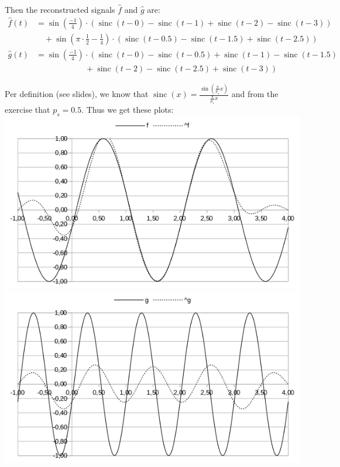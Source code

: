 \documentclass[a4paper,parskip,headheight=38pt]{scrartcl} %
\DeclareMathOperator{\sinc}{sinc}
\begin{document}
Then the reconstructed signals $\hat{f}$ and $\hat{g}$ are:
\begin{align*}
    \hat{f}(t) &= \sin(\frac{-1}{4}) \cdot \left(\sinc(t -0) - \sinc(t - 1) + \sinc(t-2) - \sinc(t - 3) \right) \\
    &\quad + \sin(\pi \cdot \frac{1}{2} - \frac{1}{4}) \cdot \left( \sinc(t - 0.5) - \sinc(t - 1.5) + \sinc(t - 2.5) \right) \\
    \hat{g}(t) &= \sin(\frac{-1}{4}) \cdot \left(\sinc(t -0) - \sinc(t - 0.5) + \sinc(t - 1) - \sinc(t - 1.5) \right. \\
    &\qquad\qquad\qquad + \left. \sinc(t-2) - \sinc(t-2.5) + \sinc(t - 3) \right)
\end{align*}

Per definition (see slides), we know that $\sinc(x) =
\frac{\sin\left(\frac{\pi}{p_s}x\right)}{\frac{\pi}{p_s}x}$ and from
the exercise that $p_s = 0.5$.  Thus we get these plots:
 \\
\includegraphics[width=\textwidth]{p1c_f}
 \\
\includegraphics[width=\textwidth]{p1c_g}
\end{document}
